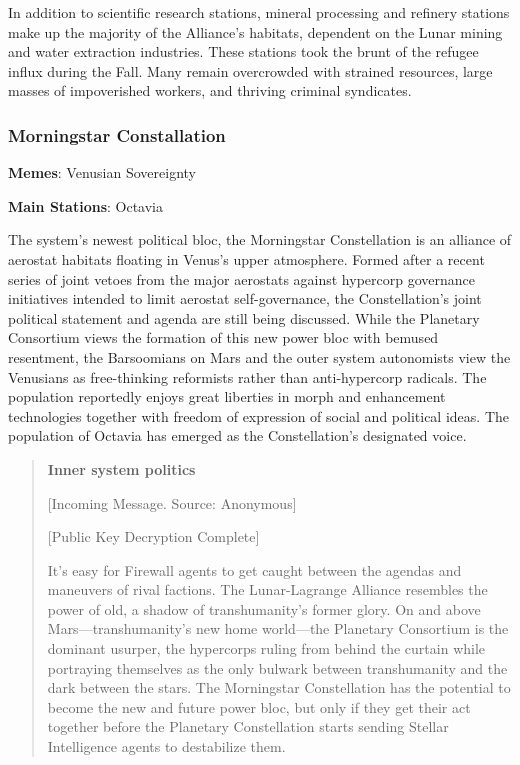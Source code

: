In addition to scientific research stations, mineral processing and
refinery stations make up the majority of the Alliance's habitats,
dependent on the Lunar mining and water extraction industries. These
stations took the brunt of the refugee influx during the Fall.  Many
remain overcrowded with strained resources, large masses of
impoverished workers, and thriving criminal syndicates.

\subsubsection{Morningstar Constallation}
\label{sec:morn-const}

\textbf{Memes}: Venusian Sovereignty

\textbf{Main Stations}: Octavia


The system's newest political bloc, the Morningstar Constellation is
an alliance of aerostat habitats floating in Venus's upper
atmosphere. Formed after a recent series of joint vetoes from the
major aerostats against hypercorp governance initiatives intended to
limit aerostat self-governance, the Constellation's joint political
statement and agenda are still being discussed. While the Planetary
Consortium views the formation of this new power bloc with bemused
resentment, the Barsoomians on Mars and the outer system autonomists
view the Venusians as free-thinking reformists rather than
anti-hypercorp radicals. The population reportedly enjoys great
liberties in morph and enhancement technologies together with freedom
of expression of social and political ideas. The population of Octavia
has emerged as the Constellation's designated voice.

\begin{quotation}
  \textbf{Inner system politics}

  [Incoming Message. Source: Anonymous]

  [Public Key Decryption Complete]


  It's easy for Firewall agents to get caught between the agendas and
  maneuvers of rival factions. The Lunar-Lagrange Alliance resembles
  the power of old, a shadow of transhumanity's former glory.  On and
  above Mars—transhumanity's new home world—the Planetary Consortium
  is the dominant usurper, the hypercorps ruling from behind the
  curtain while portraying themselves as the only bulwark between
  transhumanity and the dark between the stars. The Morningstar
  Constellation has the potential to become the new and future power
  bloc, but only if they get their act together before the Planetary
  Constellation starts sending Stellar Intelligence agents to
  destabilize them.
\end{quotation}

